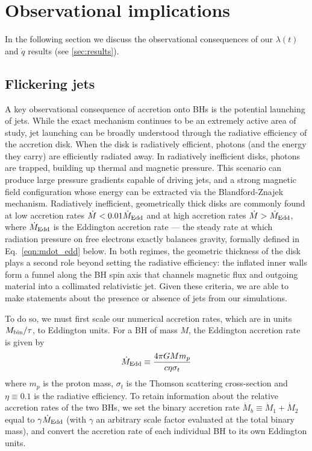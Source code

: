 \documentclass[fleqn,usenatbib]{mnras}
\begin{document}
\section{Observational implications}\label{sec:observations}
In the following section we discuss the observational consequences of our $\lambda(t)$ and $\dot{q}$ results (see \autoref{sec:results}).

\subsection{Flickering jets}

A key observational consequence of accretion onto BHs is the potential launching of jets. While the exact mechanism continues to be an extremely active area of study, jet launching can be broadly understood through the radiative efficiency of the accretion disk. When the disk is radiatively efficient, photons (and the energy they carry) are efficiently radiated away. In radiatively inefficient disks, photons are trapped, building up thermal and magnetic pressure. This scenario can produce large pressure gradients capable of driving jets, and a strong magnetic field configuration whose energy can be extracted via the Blandford-Znajek mechanism. Radiatively inefficient, geometrically thick disks are commonly found at low accretion rates $\dot{M} < 0.01 \dot{M}_{\rm Edd}$ \citep{Muryel_lowedd_jet_21} and at high accretion rates $\dot{M} > \dot{M}_{\rm Edd}$, where $\dot{M}_{\rm Edd}$ is the Eddington accretion rate --- the steady rate at which radiation pressure on free electrons exactly balances gravity, formally defined in Eq.~\ref{eqn:mdot_edd} below. In both regimes, the geometric thickness of the disk plays a second role beyond setting the radiative efficiency: the inflated inner walls form a funnel along the BH spin axis that channels magnetic flux and outgoing material into a collimated relativistic jet. Given these criteria, we are able to make statements about the presence or absence of jets from our simulations.


To do so, we must first scale our numerical accretion rates, which are in units $M_{\rm{bin}}/\tau$, to Eddington units. For a BH of mass $M$, the Eddington accretion rate is given by
\begin{equation}\label{eqn:mdot_edd}
    \dot{M}_{\rm Edd} \equiv \frac{4\pi GM m_p}{c \eta \sigma_t}
\end{equation}
where $m_p$ is the proton mass, $\sigma_t$ is the Thomson scattering cross-section and $\eta \equiv 0.1$ is the radiative efficiency. To retain information about the relative accretion rates of the two BHs, we set the binary accretion rate $\dot{M}_b \equiv \dot{M}_1 + \dot{M}_2$ equal to $\gamma \dot{M}_{\rm Edd}$ (with $\gamma$ an arbitrary scale factor evaluated at the total binary mass), and convert the accretion rate of each individual BH to its own Eddington units.
\end{document}
